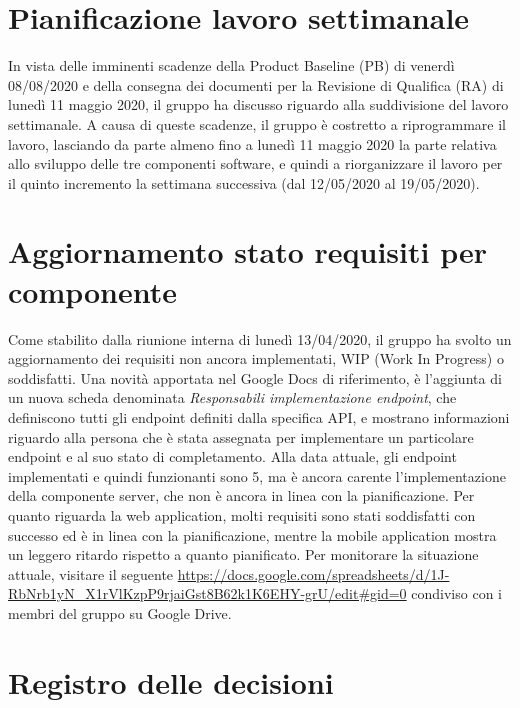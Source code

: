 \documentclass{article}
\begin{document}
\section{Pianificazione lavoro settimanale}%
\label{sec:pianificazione_lavoro_settimanale}
In vista delle imminenti scadenze della Product Baseline (PB) di venerdì 08/08/2020 e della consegna dei documenti per la Revisione di Qualifica (RA) di lunedì 11 maggio 2020, il gruppo ha discusso riguardo alla suddivisione del lavoro settimanale.
A causa di queste scadenze, il gruppo è costretto a riprogrammare il lavoro, lasciando da parte almeno fino a lunedì 11 maggio 2020 la parte relativa allo sviluppo delle tre componenti software, e quindi a riorganizzare il lavoro per il quinto incremento la settimana successiva (dal 12/05/2020 al 19/05/2020).

\section{Aggiornamento stato requisiti per componente}%
\label{sec:aggiornamento_stato_requisiti_per_componente}
Come stabilito dalla riunione interna di lunedì 13/04/2020, il gruppo ha svolto un aggiornamento dei requisiti non ancora implementati, WIP (Work In Progress) o soddisfatti.
Una novità apportata nel Google Docs di riferimento, è l'aggiunta di un nuova scheda denominata \textit{Responsabili implementazione endpoint}, che definiscono tutti gli endpoint definiti dalla specifica API, e mostrano informazioni riguardo alla persona che è stata assegnata per implementare un particolare endpoint e al suo stato di completamento.
Alla data attuale, gli endpoint implementati e quindi funzionanti sono 5, ma è ancora carente l'implementazione della componente server, che non è ancora in linea con la pianificazione.
Per quanto riguarda la web application, molti requisiti sono stati soddisfatti con successo ed è in linea con la pianificazione, mentre la mobile application mostra un leggero ritardo rispetto a quanto pianificato.
Per monitorare la situazione attuale, visitare il seguente \href{https://docs.google.com/spreadsheets/d/1J-RbNrb1yN_X1rVlKzpP9rjaiGst8B62k1K6EHY-grU/edit#gid=0}{https://docs.google.com/spreadsheets/d/1J-RbNrb1yN\_X1rVlKzpP9rjaiGst8B62k1K6EHY-grU/edit\#gid=0} condiviso con i membri del gruppo su Google Drive.

\newpage
\section{Registro delle decisioni}%
\label{sec:registro_delle_decisioni}
\end{document}
